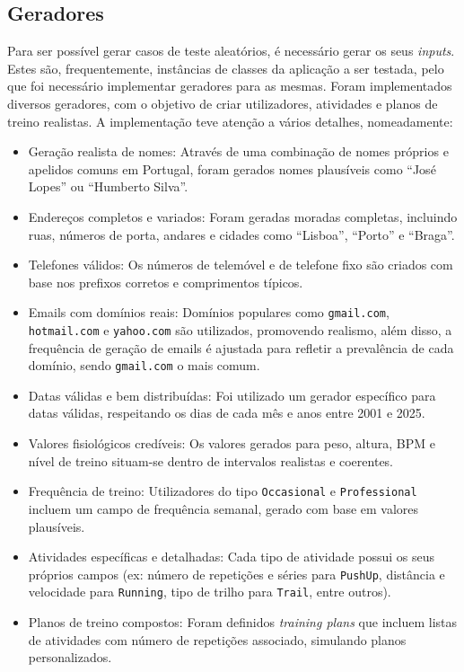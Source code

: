 \documentclass[12pt, a4paper]{article}
\begin{document}
\subsection{Geradores}

Para ser possível gerar casos de teste aleatórios, é necessário gerar os seus \emph{inputs}. Estes
são, frequentemente, instâncias de classes da aplicação a ser testada, pelo que foi necessário
implementar geradores para as mesmas. Foram implementados diversos geradores, com o objetivo
de criar utilizadores, atividades e planos de treino realistas. A implementação teve atenção a
vários detalhes, nomeadamente:

\begin{itemize}
  \item Geração realista de nomes: Através de uma combinação de nomes próprios e apelidos comuns em
    Portugal, foram gerados nomes plausíveis como ``José Lopes'' ou ``Humberto Silva''.

  \item Endereços completos e variados: Foram geradas moradas completas, incluindo ruas, números de
    porta, andares e cidades como ``Lisboa'', ``Porto'' e ``Braga''.

  \item Telefones válidos: Os números de telemóvel e de telefone fixo são criados com base nos
    prefixos corretos e comprimentos típicos.

  \item Emails com domínios reais: Domínios populares como \texttt{gmail.com}, \texttt{hotmail.com}
    e \texttt{yahoo.com} são utilizados, promovendo realismo, além disso, a frequência de geração de
    emails é ajustada para refletir a prevalência de cada domínio, sendo \texttt{gmail.com} o mais
    comum.

  \item Datas válidas e bem distribuídas: Foi utilizado um gerador específico para datas válidas,
      respeitando os dias de cada mês e anos entre 2001 e 2025.

  \item Valores fisiológicos credíveis: Os valores gerados para peso, altura, BPM e nível de treino
    situam-se dentro de intervalos realistas e coerentes.

  \item Frequência de treino: Utilizadores do tipo \texttt{Occasional} e \texttt{Professional}
    incluem um campo de frequência semanal, gerado com base em valores plausíveis.

  \item Atividades específicas e detalhadas: Cada tipo de atividade possui os seus próprios campos
    (ex: número de repetições e séries para \texttt{PushUp}, distância e velocidade para
    \texttt{Running}, tipo de trilho para \texttt{Trail}, entre outros).

  \item Planos de treino compostos: Foram definidos \emph{training plans} que incluem listas de
    atividades com número de repetições associado, simulando planos personalizados.
\end{itemize}
\end{document}

